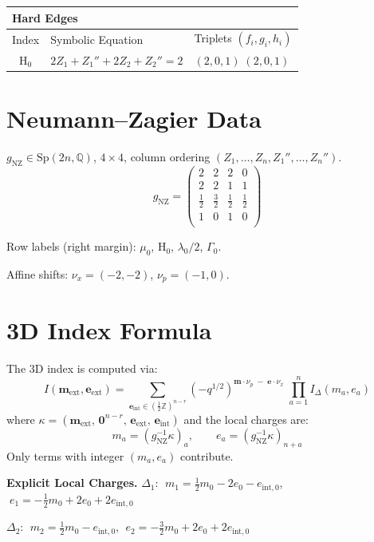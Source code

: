 \documentclass[11pt,a4paper]{article}
\newcommand{\IDelta}{I_{\Delta}}
\begin{document}
\begin{longtable}{c l l}
\toprule
\multicolumn{3}{l}{\textbf{Hard Edges}} \\ \midrule
Index & Symbolic Equation & Triplets $(f_i, g_i, h_i)$ \\ \midrule
\endhead
H$_{0}$ & $2Z_{1} + Z_{1}'' + 2Z_{2} + Z_{2}'' = 2$ & $(2,0,1)\;(2,0,1)$ \\
\bottomrule
\end{longtable}

\section{Neumann--Zagier Data}
$g_{\text{NZ}} \in \mathrm{Sp}(2n, \mathbb{Q})$, $4 \times 4$, column ordering $(Z_1, \ldots, Z_n, Z_1'', \ldots, Z_n'')$.
{\small
\[
g_{\text{NZ}} = \left(\begin{array}{rrrr}
  2 & 2 & 2 & 0 \\  %
  2 & 2 & 1 & 1 \\  %
  \tfrac{1}{2} & \tfrac{3}{2} & \tfrac{1}{2} & \tfrac{1}{2} \\  %
  1 & 0 & 1 & 0 \\  %
\end{array}\right)
\]
}

Row labels (right margin): 
$\mu_{0}$, $\text{H}_{0}$, $\lambda_{0}/2$, $\Gamma_{0}$.

Affine shifts: $\nu_x = (-2, -2)$, $\nu_p = (-1, 0)$.

\section{3D Index Formula}
The 3D index is computed via:
\[
  I(\mathbf{m}_{\text{ext}}, \mathbf{e}_{\text{ext}}) = \sum_{\mathbf{e}_{\text{int}} \in (\tfrac{1}{2}\mathbb{Z})^{n-r}} (-q^{1/2})^{\mathbf{m} \cdot \nu_p \;-\; \mathbf{e} \cdot \nu_x} \;\prod_{a=1}^{n} \IDelta(m_a, e_a)
\]
where $\kappa = (\mathbf{m}_{\text{ext}},\, \mathbf{0}^{n-r},\, \mathbf{e}_{\text{ext}},\, \mathbf{e}_{\text{int}})$ and the local charges are:
\[
  m_a = (g_{\text{NZ}}^{-1}\kappa)_a, \qquad   e_a = (g_{\text{NZ}}^{-1}\kappa)_{n+a}
\]
Only terms with integer $(m_a, e_a)$ contribute.

\noindent\textbf{Explicit Local Charges.}
$\Delta_{1}$: $\;m_{1} = \tfrac{1}{2}m_{0} - 2e_{0} - e_{\text{int},0}$, $\;e_{1} = -\tfrac{1}{2}m_{0} + 2e_{0} + 2e_{\text{int},0}$

$\Delta_{2}$: $\;m_{2} = \tfrac{1}{2}m_{0} - e_{\text{int},0}$, $\;e_{2} = -\tfrac{3}{2}m_{0} + 2e_{0} + 2e_{\text{int},0}$
\end{document}
